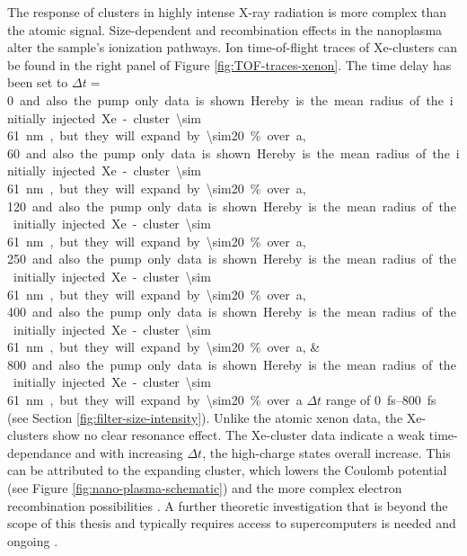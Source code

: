 The response of clusters in highly intense X-ray radiation is more complex than the atomic signal. Size-dependent \citep{Schorb-2012-PRL,Schutte-2015-JPhysB} and recombination effects in the nanoplasma \citep{Schutte-2014-PRL} alter the sample's ionization pathways. Ion time-of-flight traces of Xe-clusters can be found in the right panel of Figure \ref{fig:TOF-traces-xenon}. The time delay has been set to $\Delta t=$\SIlist{0;60;120;250;400;800} and also the pump only data is shown. Hereby is the mean radius of the initially injected Xe-cluster \SI{\sim 61}{\nano\meter}, but they will expand by \SI{\sim20}{\percent} over a $\Delta t$ range of \SIrange{0}{800}{\femto\second} (see Section \ref{fig:filter-size-intensity}). Unlike the atomic xenon data, the Xe-clusters show no clear resonance effect. The Xe-cluster data indicate a weak time-dependance and with increasing $\Delta t$, the high-charge states overall increase. This can be attributed to the expanding cluster, which lowers the Coulomb potential (see Figure \ref{fig:nano-plasma-schematic}) and the more complex electron recombination possibilities \cite{Krikunova-2009-NJP}. A further theoretic investigation that is beyond the scope of this thesis and typically requires access to supercomputers is needed and ongoing \cite{Ho-2016-PC}.
